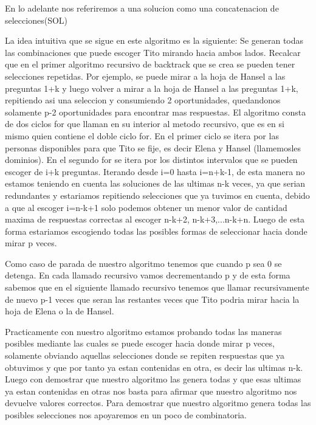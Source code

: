 \documentclass[a4paper, 12pt]{article}
\begin{document}
En lo adelante nos referiremos a una solucion como una concatenacion de selecciones(SOL)


La idea intuitiva que se sigue en este algoritmo es la siguiente:
Se generan todas las combinaciones que puede escoger Tito mirando hacia ambos lados. Recalcar que en el primer algoritmo recursivo de backtrack que se crea se pueden tener selecciones repetidas. Por ejemplo, se puede mirar a la hoja de Hansel a las preguntas 1+k y luego volver a mirar a la hoja de Hansel a las preguntas 1+k, repitiendo asi
una seleccion y consumiendo 2 oportunidades, quedandonos solamente p-2 oportunidades para encontrar mas respuestas.
El algoritmo consta de dos ciclos for que llaman en su interior al metodo recursivo, que es en si mismo quien contiene el doble ciclo for. En el primer ciclo se itera por las personas disponibles para que Tito se fije, es decir Elena y Hansel (llamemosles dominios). En el segundo for se itera por los distintos intervalos que se pueden escoger de i+k preguntas.
Iterando desde i=0 hasta i=n+k-1, de esta manera no estamos teniendo en cuenta las soluciones de las ultimas n-k veces, ya que serian redundantes y estariamos repitiendo selecciones que ya tuvimos en cuenta, debido a que al escoger i=n-k+1 solo podemos obtener un menor valor de cantidad maxima de respuestas correctas al escoger n-k+2, n-k+3,...n-k+n.
Luego de esta forma estariamos escogiendo todas las posibles formas de seleccionar hacia donde mirar p veces.

Como caso de parada de nuestro algoritmo tenemos que cuando p sea 0 se detenga. En cada llamado recursivo vamos decrementando p y de esta forma sabemos que en el siguiente llamado recursivo tenemos que llamar recursivamente de nuevo p-1 veces que seran las restantes veces que Tito podria mirar hacia la hoja de Elena o la de Hansel.

Practicamente con nuestro algoritmo estamos probando todas las maneras posibles mediante las cuales se puede escoger hacia donde mirar p veces, solamente obviando aquellas selecciones donde se repiten respuestas que ya obtuvimos y que por tanto ya estan contenidas en otra, es decir las ultimas n-k.
Luego con demostrar que nuestro algoritmo las genera todas y que esas ultimas ya estan contenidas en otras nos basta para afirmar que nuestro algoritmo nos devuelve valores correctos.
Para demostrar que nuestro algoritmo genera todas las posibles selecciones nos apoyaremos en un poco de combinatoria.
\end{document}
